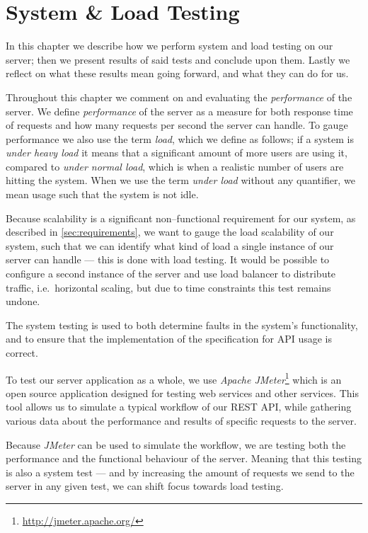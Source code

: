 \chapter{System \& Load Testing}\label{cha:system_and_load_testing}
In this chapter we describe how we perform system and load testing on our server;
then we present results of said tests and conclude upon them.
Lastly we reflect on what these results mean going forward, and what they can do for us.

Throughout this chapter we comment on and evaluating the \textit{performance} of the server.
We define \textit{performance} of the server as a measure for both response time of requests and how many requests per second the server can handle.
To gauge performance we also use the term \textit{load}, which we define as follows;
if a system is \textit{under heavy load} it means that a significant amount of more users are using it, compared to \textit{under normal load}, which is when a realistic number of users are hitting the system.
When we use the term \textit{under load} without any quantifier, we mean usage such that the system is not idle.

\bigskip
Because scalability is a significant non--functional requirement for our system, as described in \cref{sec:requirements}, we want to gauge the load scalability of our system, such that we can identify what kind of load a single instance of our server can handle --- this is done with load testing. %
It would be possible to configure a second instance of the server and use load balancer to distribute traffic, i.e.~horizontal scaling, but due to time constraints this test remains undone.

The system testing is used to both determine faults in the system's functionality, and to ensure that the implementation of the specification for API usage is correct.

\bigskip
To test our server application as a whole, we use \textit{Apache JMeter}\footnote{\url{http://jmeter.apache.org/}} which is an open source application designed for testing web services and other services.
This tool allows us to simulate a typical workflow of our REST API, while gathering various data about the performance and results of specific requests to the server.

Because \textit{JMeter} can be used to simulate the workflow, we are testing both the performance and the functional behaviour of the server.
Meaning that this testing is also a system test --- and by increasing the amount of requests we send to the server in any given test, we can shift focus towards load testing.

